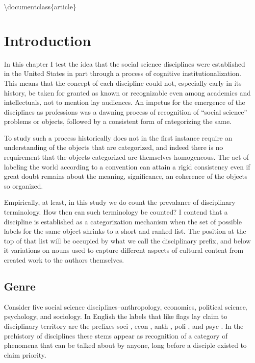 \textbackslash{}documentclass\{article\}

\section{Introduction}\label{introduction}

In this chapter I test the idea that the social science disciplines were
established in the United States in part through a process of cognitive
institutionalization. This means that the concept of each discipline
could not, especially early in its history, be taken for granted as
known or recognizable even among academics and intellectuals, not to
mention lay audiences. An impetus for the emergence of the disciplines
as professions was a dawning process of recognition of ``social
science'' problems or objects, followed by a consistent form of
categorizing the same.

To study such a process historically does not in the first instance
require an understanding of the objects that are categorized, and indeed
there is no requirement that the objects categorized are themselves
homogeneous. The act of labeling the world according to a convention can
attain a rigid consistency even if great doubt remains about the
meaning, significance, an coherence of the objects so organized.

Empirically, at least, in this study we do count the prevalance of
disciplinary terminology. How then can such terminology be counted? I
contend that a discipline is established as a categorization mechanism
when the set of possible labels for the same object shrinks to a short
and ranked list. The position at the top of that list will be occupied
by what we call the disciplinary prefix, and below it variations on
nouns used to capture different aspects of cultural content from created
work to the authors themselves.

\subsection{Genre}\label{genre}

Consider five social science disciplines--anthropology, economics,
political science, psychology, and sociology. In English the labels that
like flags lay claim to disciplinary territory are the prefixes soci-,
econ-, anth-, poli-, and psyc-. In the prehistory of disciplines these
stems appear as recognition of a category of phenomena that can be
talked about by anyone, long before a disciple existed to claim
priority.


